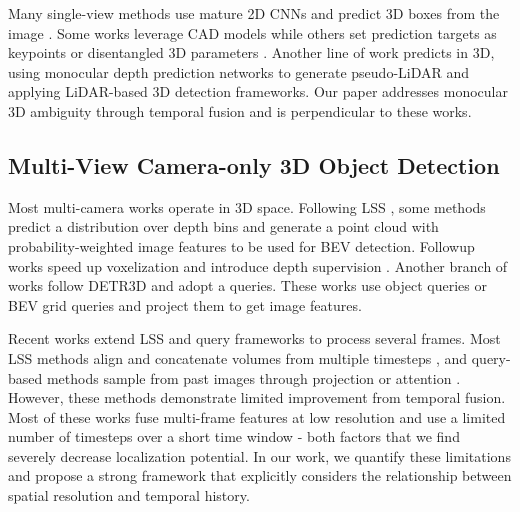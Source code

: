 \documentclass[runningheads, hyperfootnotes=false]{article}
\begin{document}
Many single-view methods use mature 2D CNNs and predict 3D boxes from the image \citep{Mousavian2017deep3dbox,brazil2019m3drpn,Qin2019MonoGRNetAG,Xu2018MultilevelFB,Zhou2019ObjectsAP}. Some works leverage CAD models \citep{liu2021autoshape,Manhardt2019ROI10DML,Barabanau2020Monocular3O} while others set prediction targets as keypoints \citep{Li2022DiversityMF,Zhang2021ObjectsAD} or disentangled 3D parameters \citep{Simonelli2019DisentanglingM3,wang2021fcos3d}. Another line of work predicts in 3D, using monocular depth prediction networks \citep{FuCVPR18DORN,Godard2017UnsupervisedMD} to generate pseudo-LiDAR \citep{wang2019pseudo,weng2019mono3dplidar} and applying LiDAR-based 3D detection frameworks. 
Our paper addresses monocular 3D ambiguity through temporal fusion and is perpendicular to these works.

\subsection{Multi-View Camera-only 3D Object Detection}
Most multi-camera works operate in 3D space. Following LSS \citep{philion2020lift}, some methods \citep{Reading2021CaDDN,huang2021bevdet,li2022unifying} predict a distribution over depth bins and generate a point cloud with probability-weighted image features to be used for BEV detection. Followup works \citep{Liu2022BEVFusionMM,li2022bevdepth} speed up voxelization and introduce depth supervision \citep{li2022bevdepth}. Another branch of works follow DETR3D \cite{wang2022detr3d} and adopt a queries. These works use object queries  \citep{wang2022detr3d,liu2022petr,chen2022polar,jiang2022polarformer} or BEV grid queries \citep{li2022bevformer} and project them to get image features.

Recent works extend LSS and query frameworks to process several frames. Most LSS methods align and concatenate volumes from multiple timesteps \citep{huang2022bevdet4d,li2022bevdepth,li2022unifying}, and query-based methods sample from past images through projection \citep{chen2022polar,jiang2022polarformer} or attention \citep{liu2022petrv2,li2022bevformer}. However, these methods demonstrate limited improvement from temporal fusion. Most of these works fuse multi-frame features at low resolution and use a limited number of timesteps over a short time window - both factors that we find severely decrease localization potential. In our work, we quantify these limitations and propose a strong framework that explicitly considers the relationship between spatial resolution and temporal history.
\end{document}
